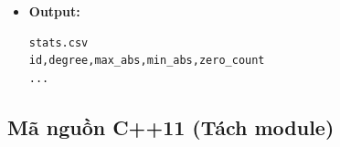 \begin{itemize}
\begin{itemize}
        \item \textbf{Module 4 (Ghi file):}
        \begin{itemize}
            \item Ghi ra \texttt{stats.csv}
            \item Định dạng:
            \texttt{id,degree,max\_abs,min\_abs,zero\_count}
        \end{itemize}
    \end{itemize}

    \item \textbf{Output:}
\begin{lstlisting}
stats.csv
id,degree,max_abs,min_abs,zero_count
...
\end{lstlisting}
\end{itemize}

\subsection{Mã nguồn C++11 (Tách module)}

